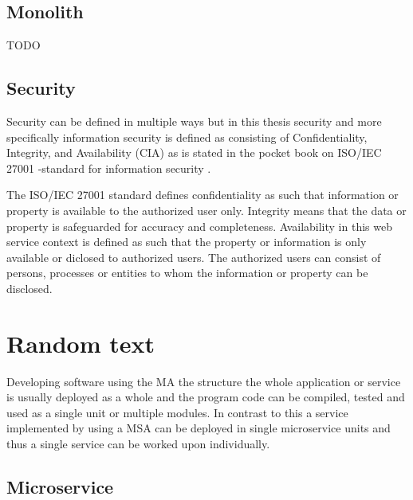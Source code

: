 \subsection{Monolith}

TODO

\subsection{Security}

Security can be defined in multiple ways but in this thesis security 
and more specifically information security is defined as consisting of 
Confidentiality, Integrity, and Availability (CIA) as is stated in the 
pocket book on ISO/IEC 27001 -standard for information security \citep{isoiec27001}.

The ISO/IEC 27001 standard defines confidentiality as such that information or property 
is available to the authorized user only.
Integrity means that the data or property is safeguarded for accuracy and completeness.
Availability in this web service context is defined as such that the property or information 
is only available or diclosed to authorized users.
The authorized users can consist of persons, processes or entities to whom 
the information or property can be disclosed.


\section{Random text}

Developing software using the MA the structure the whole application or service 
is usually deployed as a whole and the program code can be compiled, tested and
used as a single unit or multiple modules. In contrast to this a service implemented 
by using a MSA can be deployed in single microservice units and thus a single service 
can be worked upon individually.






\begin{sloppypar}

\end{sloppypar}

\subsection{Microservice}

